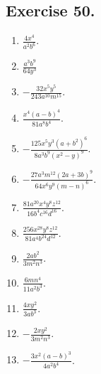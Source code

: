 \documentclass{book}
\begin{document}
\subsection*{Exercise 50.}

\begin{enumerate}
\item $\displaystyle \frac{4x^4}{a^2b^6}$.

\item $\displaystyle \frac{a^3b^9}{64y^3}$

\item $\displaystyle -\frac{32x^5y^5}{243a^{10}m^{15}}$.

\item $\displaystyle \frac{x^4 \left(a-b \right)^4}{81a^8b^4}$.

\item $\displaystyle -\frac{125x^5y^3\left(a+b^2\right)^6}{8a^3b^9
\left(x^2-y \right)^9}$.

\item $\displaystyle -\frac{27a^3m^{12} \left( 2a+3b \right)
^9}{64x^6y^9 \left( m-n \right) ^6}$.

\item $\displaystyle
\frac{81a^{20}x^4y^8z^{12}}{16b^4c^{16}d^{16}}$.

\item $\displaystyle
\frac{256x^{28}y^8z^{12}}{81a^4b^{24}d^{12}}$.

\item $\displaystyle \frac{2ab^2}{3m^2n^3}$.

\item $\displaystyle \frac{6mn^4}{11a^2b^3}$.

\item $\displaystyle \frac{4xy^2}{3ab^3}$.

\item $\displaystyle -\frac{2xy^2}{3m^2n^3}$.

\item $\displaystyle -\frac{3x^2\left(a-b\right)^3}{4a^2b^4}$.


\end{enumerate}
\end{document}
